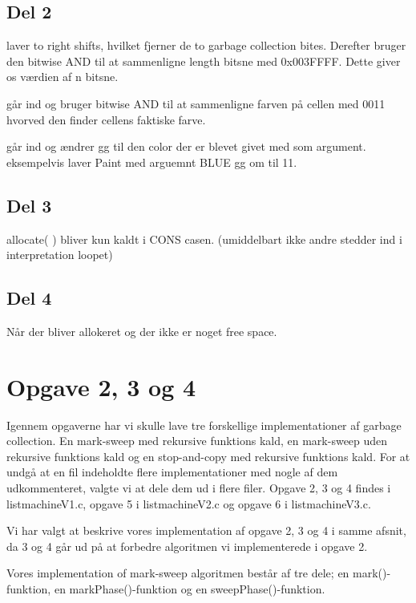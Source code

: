 \subsection{Del 2}
\label{O1_2}
\begin{my_itemize}
	\item[Length] laver to right shifts, hvilket fjerner de to garbage collection bites. Derefter bruger den bitwise AND til at sammenligne length bitsne med 0x003FFFF. Dette giver os værdien af n bitsne.
	\item[Color] går ind og bruger bitwise AND til at sammenligne farven på cellen med 0011 hvorved den finder cellens faktiske farve.
	\item[Paint] går ind og ændrer gg til den color der er blevet givet med som argument. eksempelvis laver Paint med arguemnt BLUE gg om til 11.
\end{my_itemize}

\subsection{Del 3}
\label{O1_3}
allocate( ) bliver kun kaldt i CONS casen.  (umiddelbart ikke andre stedder ind i interpretation loopet)

\subsection{Del 4}
\label{O1_4}
Når der bliver allokeret og der ikke er noget free space.

\section{Opgave 2, 3 og 4}
\label{O2}
Igennem opgaverne har vi skulle lave tre forskellige implementationer af garbage collection. En mark-sweep med rekursive funktions kald, en mark-sweep uden rekursive funktions kald og en stop-and-copy med rekursive funktions kald. For at undgå at en fil indeholdte flere implementationer med nogle af dem udkommenteret, valgte vi at dele dem ud i flere filer. Opgave 2, 3 og 4 findes i listmachineV1.c, opgave 5 i listmachineV2.c og opgave 6 i listmachineV3.c.

Vi har valgt at beskrive vores implementation af opgave 2, 3 og 4 i samme afsnit, da 3 og 4 går ud på at forbedre algoritmen vi implementerede i opgave 2.

Vores implementation of mark-sweep algoritmen består af tre dele; en mark()-funktion, en markPhase()-funktion og en sweepPhase()-funktion. 

